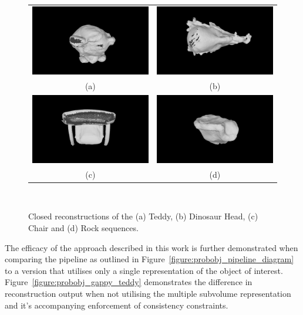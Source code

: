 \begin{figure}[!htbp]
	\centering
	\begin{tabular}{cc}
		\includegraphics[width=.4\linewidth]{figures/object_recon/top/teddy_top00.png}&
    \includegraphics[width=.4\linewidth]{figures/object_recon/top/dino_top00.png} \\
    (a) & (b) \\
		\includegraphics[width=.4\linewidth]{figures/object_recon/top/chair_top00.png}&
    \includegraphics[width=.4\linewidth]{figures/object_recon/top/rock_top00.png} \\
    (c) & (d) \\
	\end{tabular}
  \caption[Probabilistic Object Reconstruction Qualitative Results IV]
  {
    Closed reconstructions of the (a) Teddy, (b) Dinosaur Head, 
    (c) Chair and (d) Rock sequences.
  }
~\label{figure:probobj_comp_itm}
\end{figure}

The efficacy of the approach described in this work is further demonstrated when comparing
the pipeline as outlined in Figure~\ref{figure:probobj_pipeline_diagram} to a version that 
utilises only a single representation of the object of interest. Figure~\ref{figure:probobj_gappy_teddy} 
demonstrates the difference in reconstruction output when not utilising the multiple subvolume representation 
and it's accompanying enforcement of consistency constraints. 

